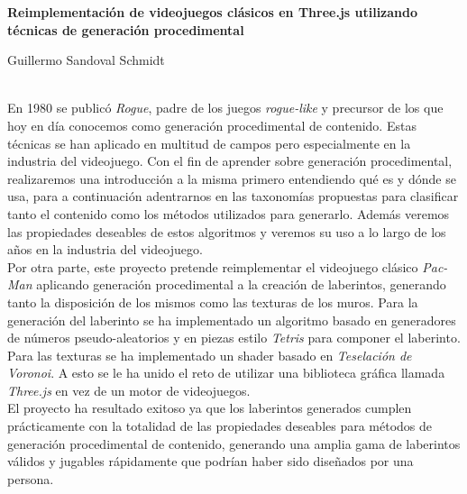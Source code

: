 \thispagestyle{empty}

\begin{center}
{\Large\bfseries Reimplementación de videojuegos clásicos en Three.js utilizando técnicas de generación procedimental}\\
\end{center}

\begin{center}
Guillermo Sandoval Schmidt\\
\end{center}

\vspace{0.5cm}

\vspace{0.7cm}
\\

En 1980 se publicó \textit{Rogue}, padre de los juegos \textit{rogue-like} y precursor de los que hoy en día conocemos como generación procedimental de contenido. Estas técnicas se han aplicado en multitud de campos pero especialmente en la industria del videojuego. Con el fin de aprender sobre generación procedimental, realizaremos una introducción a la misma primero entendiendo qué es y dónde se usa, para a continuación adentrarnos en las taxonomías propuestas para clasificar tanto el contenido como los métodos utilizados para generarlo. Además veremos las propiedades deseables de estos algoritmos y veremos su uso a lo largo de los años en la industria del videojuego.\\

Por otra parte, este proyecto pretende reimplementar el videojuego clásico \textit{Pac-Man} aplicando generación procedimental a la creación de laberintos, generando tanto la disposición de los mismos como las texturas de los muros. Para la generación del laberinto se ha implementado un algoritmo basado en generadores de números pseudo-aleatorios y en piezas estilo \textit{Tetris} para componer el laberinto. Para las texturas se ha implementado un shader basado en \textit{Teselación de Voronoi}. A esto se le ha unido el reto de utilizar una biblioteca gráfica llamada \textit{Three.js} en vez de un motor de videojuegos.\\

El proyecto ha resultado exitoso ya que los laberintos generados cumplen prácticamente con la totalidad de las propiedades deseables para métodos de generación procedimental de contenido, generando una amplia gama de laberintos válidos y jugables rápidamente que podrían haber sido diseñados por una persona.